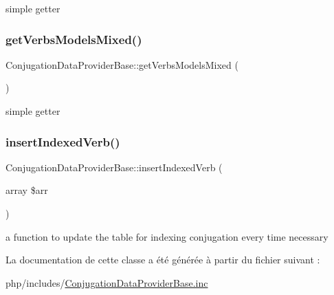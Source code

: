 simple getter \hypertarget{classConjugationDataProviderBase_a779d612fb1e1d20ea7fc31511768ad66}{}\label{classConjugationDataProviderBase_a779d612fb1e1d20ea7fc31511768ad66} 
\subsubsection{\texorpdfstring{get\+Verbs\+Models\+Mixed()}{getVerbsModelsMixed()}}
{\footnotesize\ttfamily Conjugation\+Data\+Provider\+Base\+::get\+Verbs\+Models\+Mixed (\begin{DoxyParamCaption}{ }\end{DoxyParamCaption})\hspace{0.3cm}{\ttfamily [abstract]}}

simple getter \hypertarget{classConjugationDataProviderBase_af619b3848a7928bc7e8f649de46e9686}{}\label{classConjugationDataProviderBase_af619b3848a7928bc7e8f649de46e9686} 
\subsubsection{\texorpdfstring{insert\+Indexed\+Verb()}{insertIndexedVerb()}}
{\footnotesize\ttfamily Conjugation\+Data\+Provider\+Base\+::insert\+Indexed\+Verb (\begin{DoxyParamCaption}\item[{array}]{\$arr }\end{DoxyParamCaption})\hspace{0.3cm}{\ttfamily [abstract]}}

a function to update the table for indexing conjugation every time necessary 

La documentation de cette classe a été générée à partir du fichier suivant \+:\begin{DoxyCompactItemize}
\item 
php/includes/\hyperlink{ConjugationDataProviderBase_8inc}{Conjugation\+Data\+Provider\+Base.\+inc}\end{DoxyCompactItemize}
